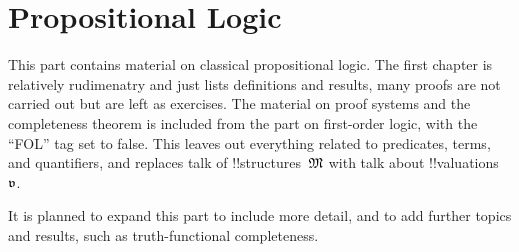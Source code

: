 \documentclass[../../include/open-logic-part]{subfiles}
\begin{document}
\part{Propositional Logic}

\begin{editorial}
  This part contains material on classical propositional logic. The
  first chapter is relatively rudimenatry and just lists definitions
  and results, many proofs are not carried out but are left as
  exercises. The material on proof systems and the completeness
  theorem is included from the part on first-order logic, with the
  ``FOL'' tag set to false. This leaves out everything related to
  predicates, terms, and quantifiers, and replaces talk of
  !!{structure}s~$\Struct{M}$ with talk about
  !!{valuation}s~$\pAssign{v}$.

  It is planned to expand this part to include
  more detail, and to add further topics and results, such as
  truth-functional completeness.
\end{editorial}











\OLEndPartHook
\end{document}
